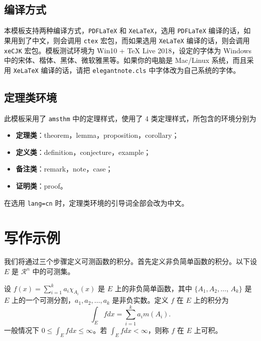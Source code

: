 \documentclass[cn,pad,11pt,green,geye]{../elegantnote}
\begin{document}
\subsection{编译方式}

本模板支持两种编译方式，\lstinline{PDFLaTeX} 和 \lstinline{XeLaTeX}，选用 \lstinline{PDFLaTeX} 编译的话，如果用到了中文，则会调用 \lstinline{ctex} 宏包，而如果选用 \lstinline{XeLaTeX} 编译的话，则会调用 \lstinline{xeCJK} 宏包。模板测试环境为 Win10 + \TeX{} Live 2018，设定的字体为 Windows 中的宋体、楷体、黑体、微软雅黑等。如果你的电脑是 Mac/Linux 系统，而且采用 \lstinline{XeLaTeX} 编译的话，请把 \lstinline{elegantnote.cls} 中字体改为自己系统的字体。

\subsection{定理类环境}
此模板采用了 \lstinline{amsthm} 中的定理样式，使用了 4 类定理样式，所包含的环境分别为
\begin{itemize}
\item \textbf{定理类}：theorem，lemma，proposition，corollary；
\item \textbf{定义类}：definition，conjecture，example；
\item \textbf{备注类}：remark，note，case；
\item \textbf{证明类}：proof。
\end{itemize}

\begin{remark}
在选用 \lstinline{lang=cn} 时，定理类环境的引导词全部会改为中文。
\end{remark}

\section{写作示例}

我们将通过三个步骤定义可测函数的积分。首先定义非负简单函数的积分。以下设 $E$ 是 $\mathcal{R}^n$ 中的可测集。

\begin{definition}[可积性]
设 $ f(x)=\sum\limits_{i=1}^{k} a_i \chi_{A_i}(x)$ 是 $E$ 上的非负简单函数，其中 $\{A_1,A_2,\ldots$, $A_k\}$ 是 $E$ 上的一个可测分割，$a_1,a_2,\ldots,a_k$ 是非负实数。定义 $f$ 在 $E$ 上的积分为
\begin{equation}
   \label{inter}
   \int_{E} f dx = \sum_{i=1}^k a_i m(A_i).
\end{equation}
一般情况下 $0 \leq \int_{E} f dx \leq \infty$。若 $\int_{E} f dx < \infty$，则称 $f$ 在 $E$ 上可积。
\end{definition}
\end{document}
